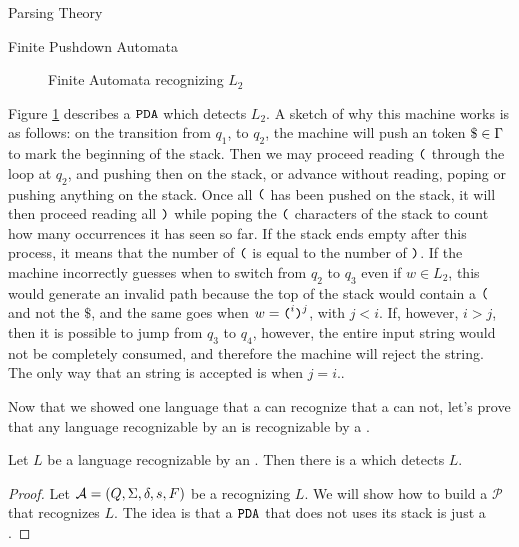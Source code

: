 \begin{section}{Parsing Theory}
\begin{subsection}{Finite Pushdown Automata}
\begin{figure}

\caption{Finite Automata recognizing $L_2$}
\label{fig:pda_l2}
\end{figure}

Figure \ref{fig:pda_l2} describes a $\texttt{PDA}$ which detects $L_2$.
A sketch of why this machine works is as follows: on the transition
from $q_1$, to $q_2$, the machine will push an token $\$ \in \Gamma$ to mark the
beginning of the stack. Then we may proceed reading $\texttt{(}$ through the loop
at $q_2$, and pushing then on the stack, or advance without reading, poping or
pushing anything on the stack.  Once all $\texttt{(}$ has been pushed on the
stack, it will then proceed reading all $\texttt{)}$ while poping the $\texttt{(}$
characters of the stack to count how many occurrences it has seen so far.
If the stack ends empty after this process, it means that the number of $\texttt{(}$
is equal to the number of $\texttt{)}$. If the machine incorrectly guesses when to switch
from $q_2$ to $q_3$ even if $w \in L_2$, this would generate an invalid path
because the top of the stack would contain a $\texttt{(}$ and not the $\$$, and
the same goes when $w = \texttt{(}^i\texttt{)}^j$, with $j < i$. If, however, $i >
j$, then it is possible to jump from $q_3$ to $q_4$, however, the entire input string
would not be completely consumed, and therefore the machine will reject the
string. The only way that an string is accepted is when $j = i$..

Now that we showed one language that a  can recognize that a
 can not, let's prove that any language recognizable by an
 is recognizable by a .

\begin{theorem}
Let $L$ be a language recognizable by an . Then there is a 
which detects $L$.
\end{theorem}
\begin{proof}
	Let $\mathcal{A} = (Q, \Sigma, \delta, s, F)$ be a  recognizing $L$.
We will show how to build a  $\mathcal{P}$ that recognizes $L$.
The idea is that a $\texttt{PDA}$ that does not uses its stack is just a .


\end{proof}
\end{subsection}
\end{section}
